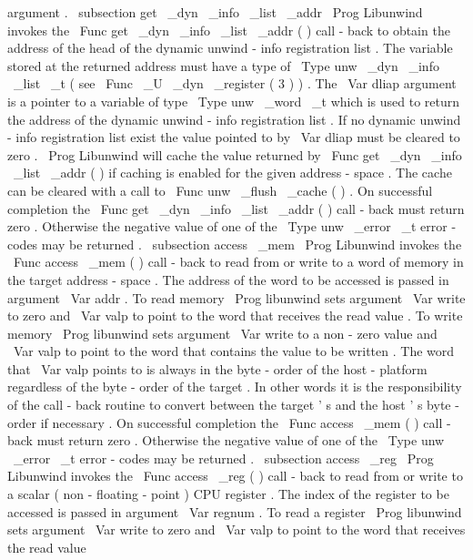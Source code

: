 argument
.
\
subsection
{
get
\
_dyn
\
_info
\
_list
\
_addr
}
\
Prog
{
Libunwind
}
invokes
the
\
Func
{
get
\
_dyn
\
_info
\
_list
\
_addr
}
(
)
call
-
back
to
obtain
the
address
of
the
head
of
the
dynamic
unwind
-
info
registration
list
.
The
variable
stored
at
the
returned
address
must
have
a
type
of
\
Type
{
unw
\
_dyn
\
_info
\
_list
\
_t
}
(
see
\
Func
{
\
_U
\
_dyn
\
_register
}
(
3
)
)
.
The
\
Var
{
dliap
}
argument
is
a
pointer
to
a
variable
of
type
\
Type
{
unw
\
_word
\
_t
}
which
is
used
to
return
the
address
of
the
dynamic
unwind
-
info
registration
list
.
If
no
dynamic
unwind
-
info
registration
list
exist
the
value
pointed
to
by
\
Var
{
dliap
}
must
be
cleared
to
zero
.
\
Prog
{
Libunwind
}
will
cache
the
value
returned
by
\
Func
{
get
\
_dyn
\
_info
\
_list
\
_addr
}
(
)
if
caching
is
enabled
for
the
given
address
-
space
.
The
cache
can
be
cleared
with
a
call
to
\
Func
{
unw
\
_flush
\
_cache
}
(
)
.
On
successful
completion
the
\
Func
{
get
\
_dyn
\
_info
\
_list
\
_addr
}
(
)
call
-
back
must
return
zero
.
Otherwise
the
negative
value
of
one
of
the
\
Type
{
unw
\
_error
\
_t
}
error
-
codes
may
be
returned
.
\
subsection
{
access
\
_mem
}
\
Prog
{
Libunwind
}
invokes
the
\
Func
{
access
\
_mem
}
(
)
call
-
back
to
read
from
or
write
to
a
word
of
memory
in
the
target
address
-
space
.
The
address
of
the
word
to
be
accessed
is
passed
in
argument
\
Var
{
addr
}
.
To
read
memory
\
Prog
{
libunwind
}
sets
argument
\
Var
{
write
}
to
zero
and
\
Var
{
valp
}
to
point
to
the
word
that
receives
the
read
value
.
To
write
memory
\
Prog
{
libunwind
}
sets
argument
\
Var
{
write
}
to
a
non
-
zero
value
and
\
Var
{
valp
}
to
point
to
the
word
that
contains
the
value
to
be
written
.
The
word
that
\
Var
{
valp
}
points
to
is
always
in
the
byte
-
order
of
the
host
-
platform
regardless
of
the
byte
-
order
of
the
target
.
In
other
words
it
is
the
responsibility
of
the
call
-
back
routine
to
convert
between
the
target
'
s
and
the
host
'
s
byte
-
order
if
necessary
.
On
successful
completion
the
\
Func
{
access
\
_mem
}
(
)
call
-
back
must
return
zero
.
Otherwise
the
negative
value
of
one
of
the
\
Type
{
unw
\
_error
\
_t
}
error
-
codes
may
be
returned
.
\
subsection
{
access
\
_reg
}
\
Prog
{
Libunwind
}
invokes
the
\
Func
{
access
\
_reg
}
(
)
call
-
back
to
read
from
or
write
to
a
scalar
(
non
-
floating
-
point
)
CPU
register
.
The
index
of
the
register
to
be
accessed
is
passed
in
argument
\
Var
{
regnum
}
.
To
read
a
register
\
Prog
{
libunwind
}
sets
argument
\
Var
{
write
}
to
zero
and
\
Var
{
valp
}
to
point
to
the
word
that
receives
the
read
value
